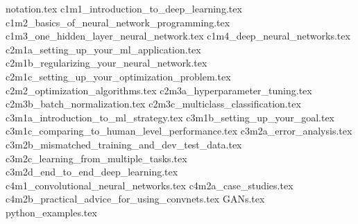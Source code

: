 \documentclass[landscape]{article}
\newcommand*{\sectiondir}{content/}
\begin{document}
\raggedright
\begin{scriptsize}
\begin{multicols*}{4}

\setlength{\premulticols}{0.5pt}
\setlength{\postmulticols}{0.5pt}
\setlength{\multicolsep}{0.5pt}
\setlength{\columnsep}{0.5pt}

{notation.tex}
{c1m1_introduction_to_deep_learning.tex}
{c1m2_basics_of_neural_network_programming.tex}
{c1m3_one_hidden_layer_neural_network.tex}
{c1m4_deep_neural_networks.tex}
{c2m1a_setting_up_your_ml_application.tex}
{c2m1b_regularizing_your_neural_network.tex}
{c2m1c_setting_up_your_optimization_problem.tex}
{c2m2_optimization_algorithms.tex}
{c2m3a_hyperparameter_tuning.tex}
{c2m3b_batch_normalization.tex}
{c2m3c_multiclass_classification.tex}
{c3m1a_introduction_to_ml_strategy.tex}
{c3m1b_setting_up_your_goal.tex}
{c3m1c_comparing_to_human_level_performance.tex}
{c3m2a_error_analysis.tex}
{c3m2b_mismatched_training_and_dev_test_data.tex}
{c3m2c_learning_from_multiple_tasks.tex}
{c3m2d_end_to_end_deep_learning.tex}
{c4m1_convolutional_neural_networks.tex}
{c4m2a_case_studies.tex}
{c4m2b_practical_advice_for_using_convnets.tex}
{GANs.tex}
{python_examples.tex}

\end{multicols*}
\end{scriptsize}
\end{document}
